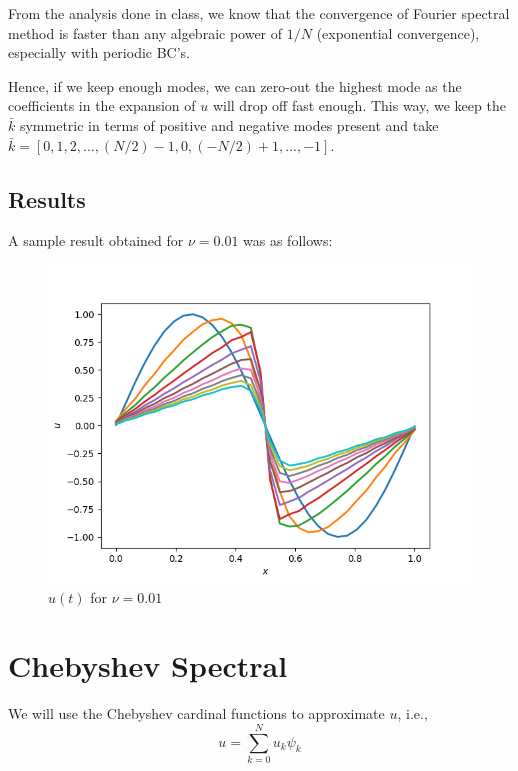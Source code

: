 \documentclass{article}
\begin{document}
From the analysis done in class, we know that the convergence of Fourier spectral method is faster than any algebraic power of $1/N$ (exponential convergence), especially with periodic BC's.

Hence, if we keep enough modes, we can zero-out the highest mode as the coefficients in the expansion of $u$ will drop off fast enough. This way, we keep the $\bar{k}$ symmetric in terms of positive and negative modes present and take $\bar{k} = [0, 1, 2, ..., (N/2)-1, 0, (-N/2)+1, ..., -1]$.
\subsection{Results}
A sample result obtained for $\nu = 0.01$ was as follows:
  \begin{figure}[H]
        \centering
        \includegraphics[scale = 0.6]{Figs/ut_fourier.png}
            \caption{$u(t)$ for $\nu = 0.01$}
        \label{fig:ut_fourier_nu_0_01}
\end{figure}

\section{Chebyshev Spectral}
We will use the Chebyshev cardinal functions to approximate $u$, i.e., $$u = \sum_{k=0}^{N} u_{k}\psi_{k} $$
\end{document}
